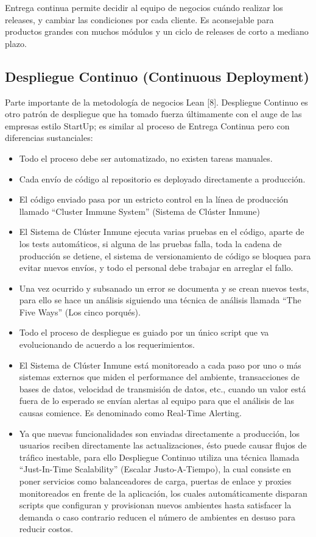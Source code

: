 \documentclass[conference]{IEEEtran}
\begin{document}
Entrega continua permite decidir al equipo de negocios cuándo realizar los releases, y cambiar las condiciones por cada cliente. Es aconsejable para productos grandes con muchos módulos y un ciclo de releases de corto a mediano plazo.

\subsection{Despliegue Continuo (Continuous Deployment)}

Parte importante de la metodología de negocios Lean [8]. Despliegue Continuo es otro patrón de despliegue que ha tomado fuerza últimamente con el auge de las empresas estilo StartUp; es similar al proceso de Entrega Continua pero con diferencias sustanciales:

\begin{itemize}
 \item Todo el proceso debe ser automatizado, no existen tareas manuales.
 \item Cada envío de código al repositorio es deployado directamente a producción.
 \item El código enviado pasa por un estricto control en la línea de producción llamado “Cluster Immune System” (Sistema de Clúster Inmune)
 \item El Sistema de Clúster Inmune ejecuta varias pruebas en el código, aparte de los tests automáticos, si alguna de las pruebas falla, toda la cadena de producción se detiene, el sistema de versionamiento de código se bloquea para evitar nuevos envíos, y todo el personal debe trabajar en arreglar el fallo.
 \item Una vez ocurrido y subsanado un error se documenta y se crean nuevos tests, para ello se hace un análisis siguiendo una técnica de análisis llamada “The Five Ways” (Los cinco porqués).
 \item Todo el proceso de despliegue es guiado por un único script que va evolucionando de acuerdo a los requerimientos.
 \item El Sistema de Clúster Inmune está monitoreado a cada paso por uno o más sistemas externos que miden el performance del ambiente, transacciones de bases de datos, velocidad de transmisión de datos, etc., cuando un valor está fuera de lo esperado se envían alertas al equipo para que el análisis de las causas comience. Es denominado como Real-Time Alerting.
 \item Ya que nuevas funcionalidades son enviadas directamente a producción, los usuarios reciben directamente las actualizaciones, ésto puede causar flujos de tráfico inestable, para ello Despliegue Continuo utiliza una técnica llamada “Just-In-Time Scalability” (Escalar Justo-A-Tiempo), la cual consiste en poner servicios como balanceadores de carga, puertas de enlace y proxies monitoreados en frente de la aplicación, los cuales automáticamente disparan scripts que configuran y provisionan nuevos ambientes hasta satisfacer la demanda o caso contrario reducen el número de ambientes en desuso para reducir costos.
\end{itemize}
\end{document}
